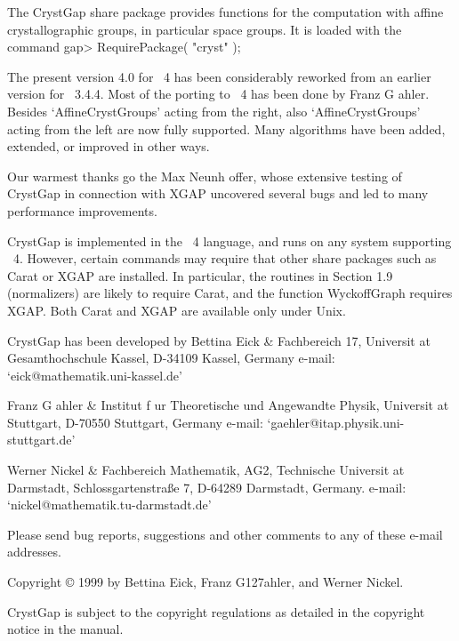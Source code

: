 
The CrystGap share package provides functions for the computation 
with affine crystallographic groups, in particular space groups.  
It is loaded with the command
\beginexample 
     gap> RequirePackage( "cryst" ); 
\endexample

The present version 4.0 for {\GAP}~4 has been considerably reworked from
an earlier version for {\GAP}~3.4.4. Most of the porting to {\GAP}~4
has been done by Franz G{ a}hler. Besides `AffineCrystGroups'
acting from the right, also `AffineCrystGroups' acting from the left 
are now fully supported. Many algorithms have been added, extended, 
or improved in other ways.

Our warmest thanks go the Max Neunh{ o}ffer, whose extensive
testing of CrystGap in connection with XGAP uncovered several bugs and
led to many performance improvements.

CrystGap is implemented in the {\GAP}~4 language, and runs on any 
system supporting {\GAP}~4. However, certain commands may require 
that other share packages such as Carat or XGAP are installed.
In particular, the routines in Section 1.9 (normalizers) are likely
to require Carat, and the function WyckoffGraph requires XGAP. 
Both Carat and XGAP are available only under Unix.

CrystGap has been developed by
\beginitems
Bettina Eick &
Fachbereich 17,
Universit{ a}t Gesamthochschule Kassel,
D-34109 Kassel, Germany \hfill\break 
e-mail: `eick@mathematik.uni-kassel.de'

Franz G{ a}hler &
Institut f{ u}r Theoretische und Angewandte Physik,\hfil\break
Universit{ a}t Stuttgart,
D-70550 Stuttgart, Germany \hfill\break
e-mail: `gaehler@itap.physik.uni-stuttgart.de'

Werner Nickel &
Fachbereich Mathematik, AG2,
Technische Universit{ a}t Darmstadt, \hfill\break
Schlossgartenstra{\ss}e 7, D-64289 Darmstadt, Germany. \hfil\break
e-mail: `nickel@mathematik.tu-darmstadt.de'
\enditems

Please send bug reports, suggestions and other comments to any of these
e-mail addresses.

\vfill
Copyright {\copyright} 1999 
by Bettina Eick, Franz G\accent127ahler, and Werner Nickel.

\smallskip
CrystGap is subject to the {\GAP} copyright regulations as 
detailed in the copyright notice in the {\GAP} manual.






